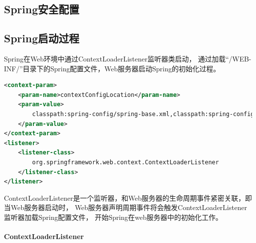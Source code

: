 \documentclass{book}
\begin{document}
\subsection{Spring安全配置}

\subsection{Spring启动过程}

Spring在Web环境中通过ContextLoaderListener监听器类启动，
通过加载“/WEB-INF/”目录下的Spring配置文件，Web服务器启动Spring的初始化过程。

\begin{lstlisting}[language=XML]
<context-param>
	<param-name>contextConfigLocation</param-name>
	<param-value>
		classpath:spring-config/spring-base.xml,classpath:spring-config/spring-ldap.xml
	</param-value>
</context-param>
<listener>
	<listener-class>
		org.springframework.web.context.ContextLoaderListener
	</listener-class>
</listener>
\end{lstlisting}

ContextLoaderListener是一个监听器，和Web服务器的生命周期事件紧密关联，即当Web服务器启动时，
Web服务器声明周期事件将会触发ContextLoaderListener监听器加载Spring配置文件，
开始Spring在web服务器中的初始化工作。

\paragraph{ContextLoaderListener}
\end{document}
